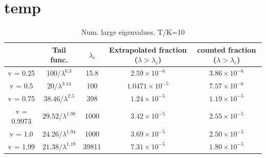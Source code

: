 \section{temp}
\begin{table}[htb!]
  \centering
  \begin{tabular}{c|c|c|c|c}
    & Tail func. & $\lambda_c$ & Extrapolated fraction ($\lambda >
    \lambda_c$) & counted fraction ($\lambda > \lambda_c$) \\
    \hline
    v = 0.25 & ${100 / \lambda^{6.3}}$ & 15.8 & $2.59\times 10^{-6} $ &
    $3.86 \times 10^{-6}$ \\
    \hline
    v = 0.5 & ${20 / \lambda^{3.14}}$ & 100 & $1.0471\times 10^{-5}$ &
    $7.57\times 10^{-6}$ \\
    \hline
    v = 0.75 & $38.46/\lambda^{2.5}$ & 398 & $1.24 \times 10^{-5}$ &
    $1.19 \times 10^{-5}$ \\
    \hline
    v = 0.9973 & $29.52/\lambda^{1.98}$ & 1000 & $3.42 \times
    10^{-5}$ & $2.55 \times 10^{-5}$ \\
    \hline
    v = 1.0 & $24.26/\lambda^{1.94}$ & 1000 & $3.69 \times 10^{-5}$ &
    $2.50 \times 10^{-5}$ \\
    \hline
    v = 1.99 & $21.38/\lambda^{1.19}$ & 39811 & $7.31 \times 10^{-5}$ &
    $1.80 \times 10^{-5}$ \\
  \end{tabular}
  \caption{Num. large eigenvalues. T/K=10}
  \label{tab:tab1}
\end{table}
